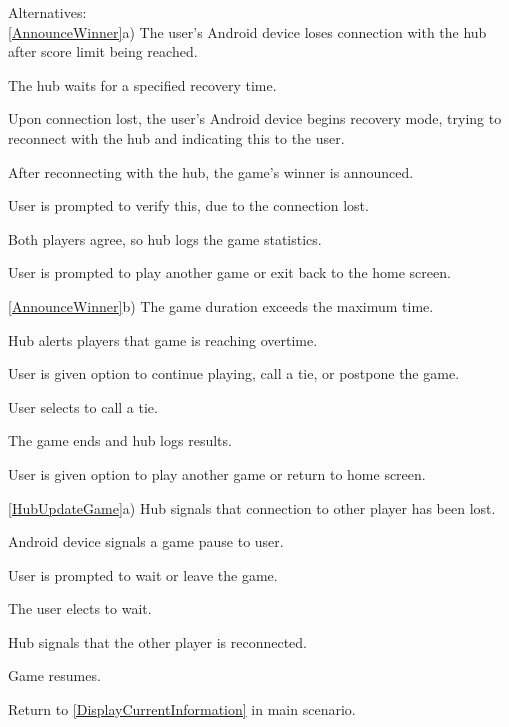 \documentclass[12pt]{article}
\newenvironment{enumerate*}%
  {\begin{enumerate}%
  	\setlength{\parsep}{0pt}
    \setlength{\itemsep}{0pt}%
    \setlength{\parskip}{0pt}}%
  {\end{enumerate}}
\begin{document}
Alternatives:\\
\ref{AnnounceWinner}a) The user's Android device loses connection with the hub after score limit being reached.
\begin{enumerate*}
\item The hub waits for a specified recovery time.
\item Upon connection lost, the user's Android device begins recovery mode, trying to reconnect with the hub and indicating this to the user.
\item After reconnecting with the hub, the game's winner is announced.  
\item User is prompted to verify this, due to the connection lost. 
\item Both players agree, so hub logs the game statistics.
\item User is prompted to play another game or exit back to the home screen.
\end{enumerate*}
\ref{AnnounceWinner}b) The game duration exceeds the maximum time.
\begin{enumerate*}
\item Hub alerts players that game is reaching overtime.
\item User is given option to continue playing, call a tie, or postpone the game.
\item User selects to call a tie. 
\item The game ends and hub logs results.
\item User is given option to play another game or return to home screen.
\end{enumerate*}
\ref{HubUpdateGame}a) Hub signals that connection to other player has been lost.
\begin{enumerate*}
\item Android device signals a game pause to user.
\item User is prompted to wait or leave the game.
\item The user elects to wait.
\item Hub signals that the other player is reconnected.
\item Game resumes.
\item Return to \ref{DisplayCurrentInformation} in main scenario.
\end{enumerate*}
\end{document}

